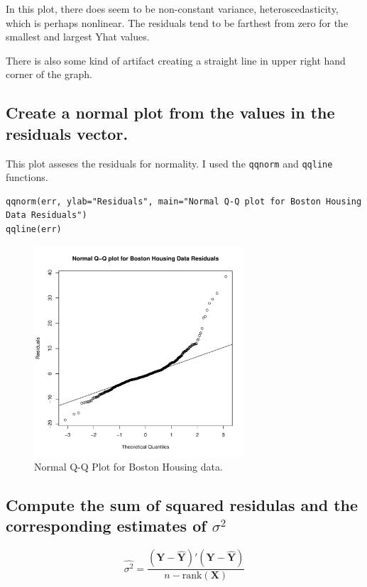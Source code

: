 \documentclass[11pt]{article}
\begin{document}
In this plot, there does seem to be non-constant variance,
heteroscedasticity, which is perhaps nonlinear. The residuals 
tend to be farthest from zero for the smallest and largest Yhat
values.

There is also some kind of artifact creating a straight line in 
upper right hand corner of the graph. 
\subsection{Create a normal plot from the values in the residuals vector.}
\label{sec-4-5}


This plot asseses the residuals for normality. I used the \verb~qqnorm~
and \verb~qqline~ functions. 


\begin{verbatim}
qqnorm(err, ylab="Residuals", main="Normal Q-Q plot for Boston Housing Data Residuals")
qqline(err)
\end{verbatim}

\begin{figure}[H]
\centering
\includegraphics[width=0.7\textwidth]{HW2_4e.pdf}
\caption{Normal Q-Q Plot for Boston Housing data.}
\end{figure}
\subsection{Compute the sum of squared residulas and the corresponding estimates of $\sigma$$^2$}
\label{sec-4-6}


\[ \hat{\sigma^2} =
\frac{(\mathbf{Y}-\hat{\mathbf{Y}})'(\mathbf{Y}-\hat{\mathbf{Y}})}{n -
\text{rank}(\mathbf{X})}
\]
\end{document}
